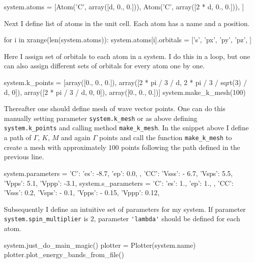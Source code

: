 \begin{python}
system.atoms = [Atom('C', array([d, 0., 0.])),
                Atom('C', array([2 * d, 0., 0.])), ]
\end{python}

Next I define list of atoms in the unit cell. Each atom has a name and a position.

\begin{python}
for i in xrange(len(system.atoms)):
    system.atoms[i].orbitals = ['s', 'px', 'py', 'pz', ]
\end{python}

Here I assign set of orbitals to each atom in a system. I do this in a loop, but one can also assign different sets of orbitals for every atom one by one.

\begin{python}
system.k_points = [array([0., 0., 0.]),
                   array([2 * pi / 3 / d, 2 * pi / 3 / sqrt(3) / d, 0]),
                   array([2 * pi / 3 / d, 0, 0]),
                   array([0., 0., 0.])]
system.make_k_mesh(100)
\end{python}

Thereafter one should define mesh of wave vector points. One can do this manually setting parameter \verb!system.k_mesh! or as above defining \verb!system.k_points! and calling method \verb!make_k_mesh!. In the snippet above I define a path of $\Gamma$, $K$, $M$ and again $\Gamma$ points and call the function \verb!make_k_mesh! to create a mesh with approximately $100$ points following the path defined in the previous line.

\begin{python}
system.parameters = {
    'C': {
        'es': -8.7,
        'ep': 0.0,
    },
    'CC': {
        'Vsss': - 6.7,
        'Vsps': 5.5,
        'Vpps': 5.1,
        'Vppp': -3.1,
    }
}
system.s_parameters = {
    'C': {
        'es': 1.,
        'ep': 1.,
    },
    'CC': {
        'Vsss': 0.2,
        'Vsps': - 0.1,
        'Vpps': - 0.15,
        'Vppp': 0.12,
    }
}
\end{python}

Subsequently I define an intuitive set of parameters for my system. If parameter \verb!system.spin_multiplier! is $2$, parameter \verb!'lambda'! should be defined for each atom.

\begin{python}
system.just_do_main_magic()
plotter = Plotter(system.name)
plotter.plot_energy_bands_from_file()
\end{python}

